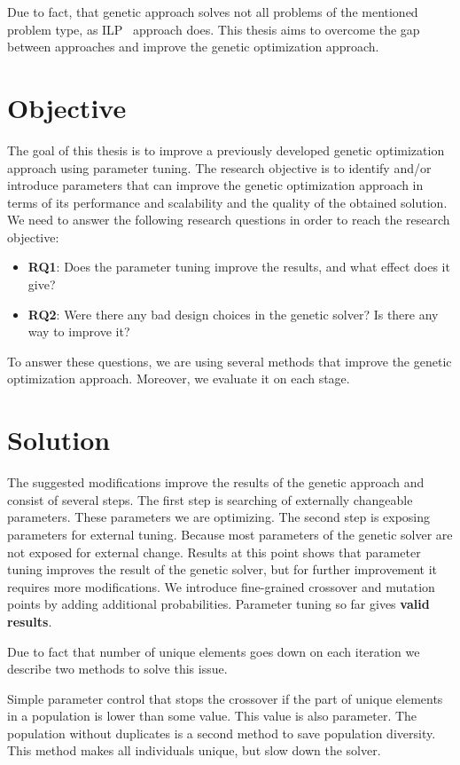 Due to fact, that genetic approach solves not all problems of the mentioned problem type, as ILP~\cite{gotz18} approach does.
This thesis aims to overcome the gap between approaches and improve the genetic optimization approach.


\section{Objective}
The goal of this thesis is to improve a previously developed genetic optimization approach using parameter tuning.
The research objective is to identify and/or introduce parameters that can improve the genetic optimization approach in terms of its performance and scalability and the quality of the obtained solution. We need to answer the following research questions in order to reach the research objective: 
\begin{itemize}
	\item \textbf{RQ1}: Does the parameter tuning improve the results, and what effect does it give?
	\item \textbf{RQ2}: Were there any bad design choices in the genetic solver? Is there any way to improve it?
\end{itemize}

To answer these questions, we are using several methods that improve the genetic optimization approach. Moreover, we evaluate it on each stage. 

\section{Solution}

The suggested modifications improve the results of the genetic approach and consist of several steps.
The first step is searching of externally changeable parameters. These parameters we are optimizing. 
The second step is exposing parameters for external tuning. Because most parameters of the genetic solver are not exposed for external change.
Results at this point shows that parameter tuning improves the result of the genetic solver, but for further improvement it requires more modifications.
We introduce fine-grained crossover and mutation points by adding additional probabilities. Parameter tuning so far gives \textbf{valid results}. 

Due to fact that number of unique elements goes down on each iteration we describe two methods to solve this issue.

Simple parameter control that stops the crossover if the part of unique elements in a population is lower than some value. This value is also parameter. 
The population without duplicates is a second method to save population diversity. This method makes all individuals unique, but slow down the solver.

